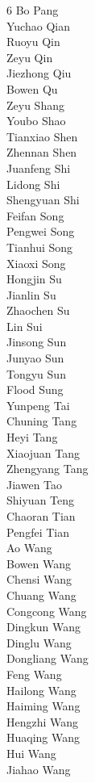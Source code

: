 \documentclass{article}
\begin{document}
\begin{multicols}{6}
{Bo Pang\\
Yuchao Qian\\
Ruoyu Qin\\
Zeyu Qin\\
Jiezhong Qiu\\
Bowen Qu\\
Zeyu Shang\\
Youbo Shao\\
Tianxiao Shen\\
Zhennan Shen\\
Juanfeng Shi\\
Lidong Shi\\
Shengyuan Shi\\
Feifan Song\\
Pengwei Song\\
Tianhui Song\\
Xiaoxi Song\\
Hongjin Su\\
Jianlin Su\\
Zhaochen Su\\
Lin Sui\\
Jinsong Sun\\
Junyao Sun\\
Tongyu Sun\\
Flood Sung\\
Yunpeng Tai\\
Chuning Tang\\
Heyi Tang\\
Xiaojuan Tang\\
Zhengyang Tang\\
Jiawen Tao\\
Shiyuan Teng\\
Chaoran Tian\\
Pengfei Tian\\
Ao Wang\\
Bowen Wang\\
Chensi Wang\\
Chuang Wang\\
Congcong Wang\\
Dingkun Wang\\
Dinglu Wang\\
Dongliang Wang\\
Feng Wang\\
Hailong Wang\\
Haiming Wang\\
Hengzhi Wang\\
Huaqing Wang\\
Hui Wang\\
Jiahao Wang\\
}
\end{multicols}
\end{document}
